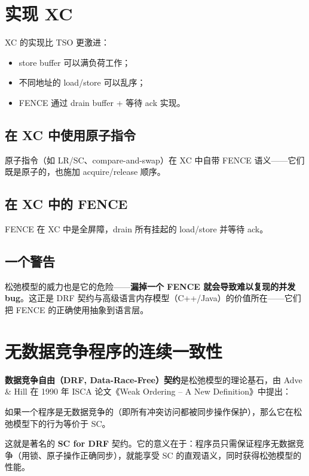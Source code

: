 \section{实现 XC}

XC 的实现比 TSO 更激进：

\begin{itemize}
\item store buffer 可以满负荷工作；
\item 不同地址的 load/store 可以乱序；
\item FENCE 通过 drain buffer + 等待 ack 实现。
\end{itemize}


\subsection{在 XC 中使用原子指令}

原子指令（如 LR/SC、compare-and-swap）在 XC 中自带 FENCE 语义——它们既是原子的，也施加 acquire/release 顺序。

\subsection{在 XC 中的 FENCE}

FENCE 在 XC 中是全屏障，drain 所有挂起的 load/store 并等待 ack。

\subsection{一个警告}

松弛模型的威力也是它的危险——\textbf{漏掉一个 FENCE 就会导致难以复现的并发 bug}。这正是 DRF 契约与高级语言内存模型（C++/Java）的价值所在——它们把 FENCE 的正确使用抽象到语言层。

\section{无数据竞争程序的连续一致性}

\textbf{数据竞争自由（DRF, Data-Race-Free）契约}是松弛模型的理论基石，由 Adve \& Hill 在 1990 年 ISCA 论文《Weak Ordering – A New Definition》中提出：

\begin{epigraph}
如果一个程序是无数据竞争的（即所有冲突访问都被同步操作保护），那么它在松弛模型下的行为等价于 SC。
\end{epigraph}


这就是著名的 \textbf{SC for DRF} 契约。它的意义在于：程序员只需保证程序无数据竞争（用锁、原子操作正确同步），就能享受 SC 的直观语义，同时获得松弛模型的性能。

